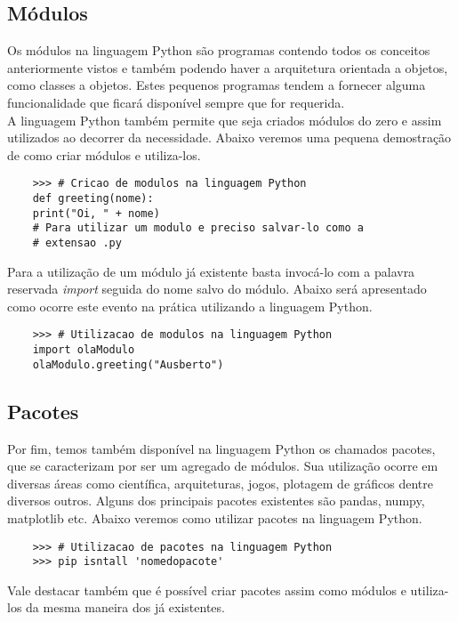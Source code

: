             \subsection{M\'{o}dulos}
Os módulos na linguagem Python são programas contendo todos os conceitos anteriormente vistos e também podendo haver a arquitetura orientada a objetos, como classes a objetos. Estes pequenos programas tendem a fornecer alguma funcionalidade que ficará disponível sempre que for requerida. \\
A linguagem Python também permite que seja criados módulos do zero e assim utilizados ao decorrer da necessidade. Abaixo veremos uma pequena demostração de como criar módulos e utiliza-los.
\begin{lstlisting}
	>>> # Cricao de modulos na linguagem Python
	def greeting(nome):
	print("Oi, " + nome)
	# Para utilizar um modulo e preciso salvar-lo como a 
	# extensao .py  
\end{lstlisting} 

Para a utilização de um módulo já existente basta invocá-lo com a palavra reservada \textit{import} seguida do nome salvo do módulo. Abaixo será apresentado como ocorre este evento na prática utilizando a linguagem Python.
\begin{lstlisting}
	>>> # Utilizacao de modulos na linguagem Python
	import olaModulo
	olaModulo.greeting("Ausberto")
\end{lstlisting} 
            \subsection{Pacotes}
Por fim, temos também disponível na linguagem Python os chamados pacotes, que se caracterizam por ser um agregado de módulos. Sua utilização ocorre em diversas áreas como científica, arquiteturas, jogos, plotagem de gráficos dentre diversos outros. Alguns dos principais pacotes existentes são pandas, numpy, matplotlib etc. Abaixo veremos como utilizar pacotes na linguagem Python. 
\begin{lstlisting}
	>>> # Utilizacao de pacotes na linguagem Python
	>>> pip isntall 'nomedopacote'
\end{lstlisting} 
Vale destacar também que é possível criar pacotes assim como módulos e utiliza-los da mesma maneira dos já existentes. 
    





